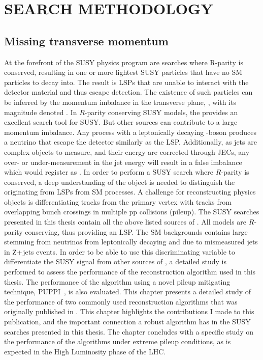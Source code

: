 \part{SEARCH METHODOLOGY}
\chapter{Missing transverse momentum}\label{sec:met}
\noindent\justify
At the forefront of the SUSY physics program are searches where R-parity is conserved, resulting in one or more lightest SUSY particles that have no SM particles to decay into. 
The result is LSPs that are unable to interact with the detector material and thus escape detection.
The existence of such particles can be inferred by the momentum imbalance in the transverse plane, \ptvecmiss, with its magnitude denoted \ptmiss. 
In $R$-parity conserving SUSY models, the \ptmiss provides an excellent search tool for SUSY. But other sources can contribute to a large momentum imbalance. 
Any process with a leptonically decaying \PW-boson produces a neutrino that escape the detector similarly as the LSP. 
Additionally, as jets are complex objects to measure, and their energy are corrected through JECs, any over- or under-measurement in the jet energy will result in a false imbalance which would register as \ptmiss.
In order to perform a SUSY search where $R$-parity is conserved, a deep understanding of the \ptmiss object is needed to distinguish the \ptmiss originating from LSPs from SM processes. 
A challenge for reconstructing physics objects is differentiating tracks from the primary vertex with tracks from overlapping bunch crossings in multiple pp collisions (pileup).
\newpara
\noindent\justify
The SUSY searches presented in this thesis contain all the above listed sources of \ptmiss. 
All models are $R$-parity conserving, thus providing an LSP. 
The SM backgrounds contains large \ptmiss stemming from neutrinos from leptonically decaying \ttbar and due to mismeasured jets in $\mathrm{Z}+$jets events.
In order to be able to use this discriminating variable to differentiate the SUSY signal from other sources of \ptmiss, a detailed study is performed to assess the performance of the \ptmiss reconstruction algorithm used in this thesis. 
The performance of the \ptmiss algorithm using a novel pileup mitigating technique, PUPPI~\cite{Bertolini:2014bba}, is also evaluated.  
\newpara
\noindent\justify
This chapter presents a detailed study of the performance of two commonly used \ptmiss reconstruction algorithms that was originally published in \cite{Sirunyan:2019kia}. 
This chapter highlights the contributions I made to this publication, and the important connection a robust \ptmiss algorithm has in the SUSY searches presented in this thesis.  
The chapter concludes with a specific study on the performance of the algorithms under extreme pileup conditions, as is expected in the High Luminosity phase of the LHC.    
\newpage
